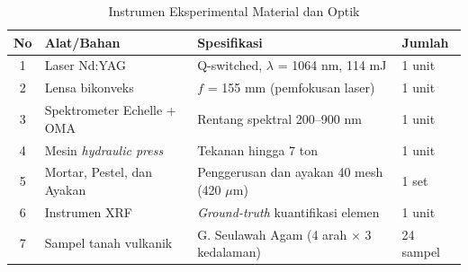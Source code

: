 \documentclass[12pt, a4paper]{article}
\begin{document}
\begin{table}[htbp]
\centering
\caption{Instrumen Eksperimental Material dan Optik}
\label{tab:alat-bahan}
\small
\begin{tabular}{clp{5.5cm}l}
\toprule
\textbf{No} & \textbf{Alat/Bahan} & \textbf{Spesifikasi} & \textbf{Jumlah} \\
\midrule
1  & Laser Nd:YAG              & Q-switched, $\lambda$ = 1064 nm, 114 mJ   & 1 unit \\
2  & Lensa bikonveks           & $f$ = 155 mm (pemfokusan laser)            & 1 unit \\
3  & Spektrometer Echelle + OMA& Rentang spektral 200--900 nm               & 1 unit \\
4  & Mesin \textit{hydraulic press} & Tekanan hingga 7 ton                  & 1 unit \\
5  & Mortar, Pestel, dan Ayakan& Penggerusan dan ayakan 40 mesh (420 $\mu$m) & 1 set  \\
6  & Instrumen XRF             & \textit{Ground-truth} kuantifikasi elemen  & 1 unit \\
7  & Sampel tanah vulkanik     & G. Seulawah Agam (4 arah $\times$ 3 kedalaman) & 24 sampel \\
\bottomrule
\end{tabular}
\end{table}
\end{document}
